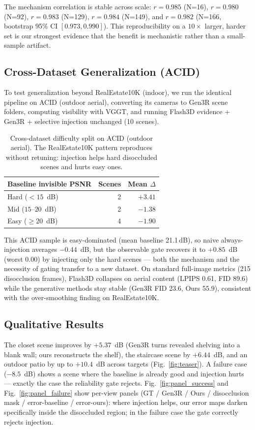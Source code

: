 \documentclass[10pt,twocolumn,letterpaper]{article}
\begin{document}
The mechanism correlation is stable across scale: $r=0.985$ (N=16), $r=0.980$
(N=92), $r=0.983$ (N=129), $r=0.984$ (N=149), and $r=0.982$ (N=166, bootstrap 95\% CI $[0.973,0.990]$). This
reproducibility on a $10\times$ larger, harder set is our strongest evidence
that the benefit is mechanistic rather than a small-sample artifact.

\subsection{Cross-Dataset Generalization (ACID)}
\label{sec:acid}
To test generalization beyond RealEstate10K (indoor), we run the identical
pipeline on ACID (outdoor aerial), converting its cameras to Gen3R scene
folders, computing visibility with VGGT, and running Flash3D evidence + Gen3R +
selective injection unchanged (10 scenes).

\begin{table}[t]
\centering\small
\caption{Cross-dataset difficulty split on ACID (outdoor aerial). The
RealEstate10K pattern reproduces without retuning: injection helps hard
disoccluded scenes and hurts easy ones.}
\begin{tabular}{lrr}
\toprule
Baseline invisible PSNR & Scenes & Mean $\Delta$ \\
\midrule
Hard ($<15$~dB) & 2 & $\mathbf{+3.41}$ \\
Mid ($15$--$20$~dB) & 2 & $-1.38$ \\
Easy ($\ge20$~dB) & 4 & $\mathbf{-1.90}$ \\
\bottomrule
\end{tabular}
\end{table}
This ACID sample is easy-dominated (mean baseline 21.1\,dB), so naive
always-injection averages $-0.44$~dB, but the observable gate recovers it to
$+0.85$~dB (worst 0.00) by injecting only the hard scenes --- both the mechanism
and the necessity of gating transfer to a new dataset. On standard full-image
metrics (215 disocclusion frames), Flash3D collapses on aerial content (LPIPS
0.61, FID 89.6) while the generative methods stay stable (Gen3R FID 23.6, Ours
55.9), consistent with the over-smoothing finding on RealEstate10K.

\subsection{Qualitative Results}
\label{sec:qual}
The closet scene improves by $+5.37$~dB (Gen3R turns revealed shelving into a
blank wall; ours reconstructs the shelf), the staircase scene by $+6.44$~dB, and
an outdoor patio by up to $+10.4$~dB across targets (Fig.~\ref{fig:teaser}). A
failure case ($-8.5$~dB) shows a scene where the baseline is already good and
injection hurts --- exactly the case the reliability gate rejects.
Fig.~\ref{fig:panel_success} and Fig.~\ref{fig:panel_failure} show per-view
panels (GT / Gen3R / Ours / disocclusion mask / error-baseline / error-ours):
where injection helps, our error maps darken specifically inside the disoccluded
region; in the failure case the gate correctly rejects injection.
\end{document}
